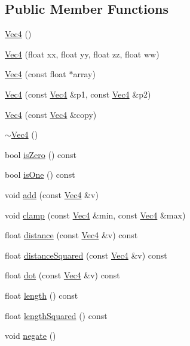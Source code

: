 \subsection*{Public Member Functions}
\begin{DoxyCompactItemize}
\item 
\hyperlink{classVec4_a33074e443f66804abe8be3b3e98745bd}{Vec4} ()
\item 
\hyperlink{classVec4_a96da810dd4ac8de9dd0ede2d29528ee4}{Vec4} (float xx, float yy, float zz, float ww)
\item 
\hyperlink{classVec4_ac7a50dd21f1ba9b59ebaab777e41918f}{Vec4} (const float $\ast$array)
\item 
\hyperlink{classVec4_a91984373f7c3e83afcadf30ec5dad52a}{Vec4} (const \hyperlink{classVec4}{Vec4} \&p1, const \hyperlink{classVec4}{Vec4} \&p2)
\item 
\hyperlink{classVec4_acf7b803835459315b73f0cab3b5d392c}{Vec4} (const \hyperlink{classVec4}{Vec4} \&copy)
\item 
\hyperlink{classVec4_a3c8428ad7cfa4fe9e82ea571ab0ad119}{$\sim$\+Vec4} ()
\item 
bool \hyperlink{classVec4_a4736299b9772b67d32f3ca2ef45f39ad}{is\+Zero} () const
\item 
bool \hyperlink{classVec4_aed369ed7241495fa5bf5e7e21a327705}{is\+One} () const
\item 
void \hyperlink{classVec4_a70178c94654489167656a8fe9452f14b}{add} (const \hyperlink{classVec4}{Vec4} \&v)
\item 
void \hyperlink{classVec4_a6f571d3b456dde4cd2bb6fbaf280e6de}{clamp} (const \hyperlink{classVec4}{Vec4} \&min, const \hyperlink{classVec4}{Vec4} \&max)
\item 
float \hyperlink{classVec4_a067897a2fd0c8b42e73a07e461d83099}{distance} (const \hyperlink{classVec4}{Vec4} \&v) const
\item 
float \hyperlink{classVec4_ad8b026a5e96599e253ab0d844fcddb72}{distance\+Squared} (const \hyperlink{classVec4}{Vec4} \&v) const
\item 
float \hyperlink{classVec4_ab23760fc52f652e9382d98f1e50e8a1b}{dot} (const \hyperlink{classVec4}{Vec4} \&v) const
\item 
float \hyperlink{classVec4_ac42249851a68eaf15815285b76763058}{length} () const
\item 
float \hyperlink{classVec4_a06243f2009024c79f544c99acf621e53}{length\+Squared} () const
\item 
void \hyperlink{classVec4_a3d83bd288450da743e021507acc41f48}{negate} ()

\end{DoxyCompactItemize}
